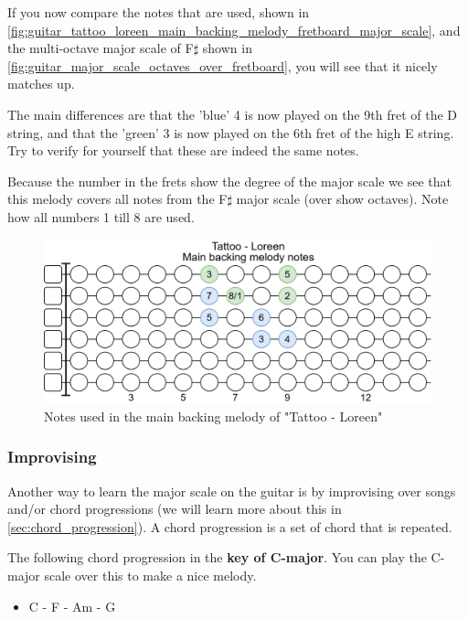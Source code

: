 If you now compare the notes that are used, shown in \autoref{fig:guitar_tattoo_loreen_main_backing_melody_fretboard_major_scale}, and the multi-octave major scale of F$\sharp$ shown in \autoref{fig:guitar_major_scale_octaves_over_fretboard}, you will see that it nicely matches up.

The main differences are that the 'blue' 4 is now played on the 9th fret of the D string, and that the 'green' 3 is now played on the 6th fret of the high E string. Try to verify for yourself that these are indeed the same notes.

Because the number in the frets show the degree of the major scale we see that this melody covers all notes from the F$\sharp$ major scale (over show octaves). Note how all numbers 1 till 8 are used.

\begin{figure}[h]
	\centering
	\includegraphics[height=0.2\textheight]{../../Images/NotesUsedInMainBackingMelodyTattooLoreen.png}
	\caption{Notes used in the main backing melody of "Tattoo - Loreen"}
	\label{fig:guitar_tattoo_loreen_main_backing_melody_fretboard_major_scale}
\end{figure}

\newpage

\subsubsection{Improvising}

Another way to learn the major scale on the guitar is by improvising over songs and/or chord progressions (we will learn more about this in \autoref{sec:chord_progression}). A chord progression is a set of chord that is repeated.

The following chord progression in the \textbf{key of C-major}. You can play the C-major scale over this to make a nice melody.


\begin{itemize}
	\item C - F - Am - G
\end{itemize}

